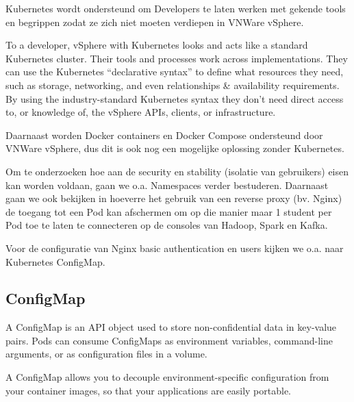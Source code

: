 Kubernetes wordt ondersteund om Developers te laten werken met gekende tools en begrippen zodat ze zich niet moeten verdiepen in VNWare vSphere.

To a developer, vSphere with Kubernetes looks and acts like a standard Kubernetes cluster. Their tools and processes work across implementations. They can use the Kubernetes “declarative syntax” to define what resources they need, such as storage, networking, and even relationships & availability requirements. By using the industry-standard Kubernetes syntax they don’t need direct access to, or knowledge of, the vSphere APIs, clients, or infrastructure.\autocite{VMware2019}

Daarnaast worden Docker containers en Docker Compose ondersteund door VNWare vSphere, dus dit is ook nog een mogelijke oplossing zonder Kubernetes. 


Om te onderzoeken hoe aan de security en stability (isolatie van gebruikers) eisen kan worden voldaan, gaan we o.a. Namespaces verder bestuderen. Daarnaast gaan we ook bekijken in hoeverre het gebruik van een reverse proxy (bv. Nginx) de toegang tot een Pod kan afschermen om op die manier maar 1 student per Pod toe te laten te connecteren op de consoles van Hadoop, Spark en Kafka.

Voor de configuratie van Nginx basic authentication en users kijken we o.a. naar Kubernetes ConfigMap.

\subsection{ConfigMap}
A ConfigMap is an API object used to store non-confidential data in key-value pairs. Pods can consume ConfigMaps as environment variables, command-line arguments, or as configuration files in a volume.

A ConfigMap allows you to decouple environment-specific configuration from your container images, so that your applications are easily portable.\autocite{Kubernetes2023}
